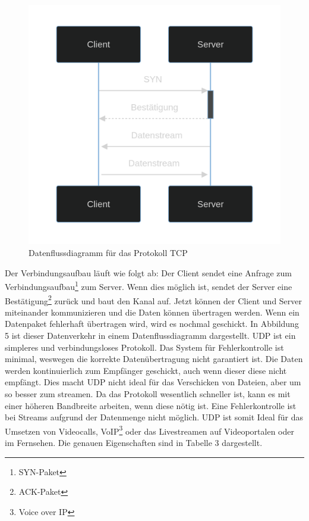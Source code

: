 \documentclass[12pt]{article}
\begin{document}
\begin{figure}
	\centering
	\includegraphics[scale=0.12]{Bilder/Datenfluss_TCP}
	\caption{Datenflussdiagramm für das Protokoll TCP\cite{datenflussdiagramm-tcp}}
	\label{fig:figure6}
\end{figure}
\vspace{-10pt}
Der Verbindungsaufbau läuft wie folgt ab: 
Der Client sendet eine Anfrage zum Verbindungsaufbau\footnote{SYN-Paket} zum Server. Wenn dies möglich ist, sendet der Server eine Bestätigung\footnote{ACK-Paket} zurück und baut den Kanal auf. Jetzt können der Client und Server miteinander kommunizieren und die Daten können übertragen werden. Wenn ein Datenpaket fehlerhaft übertragen wird, wird es nochmal geschickt.\cite{tcp-elektronik-kompendium} In Abbildung 5 ist dieser Datenverkehr in einem Datenflussdiagramm dargestellt. 
\newpage
UDP ist ein simpleres und verbindungsloses Protokoll. Das System für Fehlerkontrolle ist minimal, weswegen die korrekte Datenübertragung nicht garantiert ist. Die Daten werden kontinuierlich zum Empfänger geschickt, auch wenn dieser diese nicht empfängt. Dies macht UDP nicht ideal für das Verschicken von Dateien, aber um so besser zum streamen. Da das Protokoll wesentlich schneller ist, kann es mit einer höheren Bandbreite arbeiten, wenn diese nötig ist. Eine Fehlerkontrolle ist bei Streams aufgrund der Datenmenge nicht möglich. UDP ist somit Ideal für das Umsetzen von Videocalls, VoIP\footnote{Voice over IP} oder das Livestreamen auf Videoportalen oder im Fernsehen.\cite{udp} Die genauen Eigenschaften sind in Tabelle 3 dargestellt. 
\end{document}
